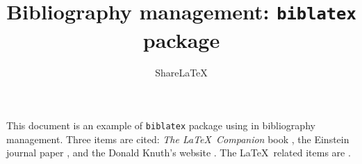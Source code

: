 \documentclass[a4paper,10pt]{article}
\title{Bibliography management: \texttt{biblatex} package}
\author{Share\LaTeX}
\begin{document}
\maketitle

This document is an example of \texttt{biblatex} package using in bibliography management. Three items are cited: \textit{The \LaTeX\ Companion} book \cite{latexcompanion}, the Einstein journal paper \cite{einstein}, and the Donald Knuth's website \cite{knuthwebsite}. The \LaTeX\ related items are \cite{latexcompanion,knuthwebsite}. 

\medskip

\printbibliography
\end{document}
